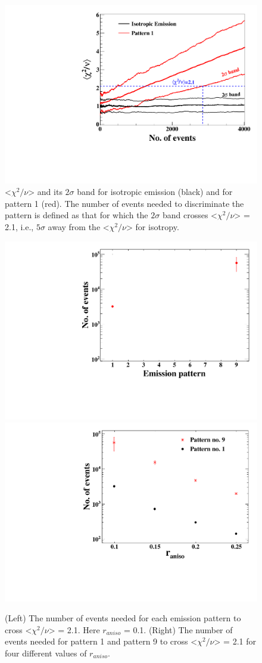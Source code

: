 \begin{figure}[h]
\centerline{\includegraphics[width=0.5\linewidth]{Pattern1.pdf}}
\caption{<$\chi^2/\nu$> and its $2\sigma$ band for isotropic emission (black) and for pattern 1 (red). 
The number of events needed to discriminate the pattern is defined as that for which 
the $2\sigma$ band crosses <$\chi^2/\nu$> = 2.1, i.e., $5\sigma$ away from the <$\chi^2/\nu$> for isotropy. }
\label{fig:pattern1}
\end{figure}

\begin{figure}[h]
\centering
\includegraphics[width=0.45\linewidth]{ConvergenceVsPattern.pdf}
\hspace{0.1cm}
\includegraphics[width=0.45\linewidth]{ConvergenceVsRaniso.pdf}
\caption{(Left) The number of events needed for each emission pattern to cross <$\chi^2/\nu$> = 2.1. Here 
$r_{aniso}$ = 0.1. (Right) The number of events needed for pattern 1 and pattern 9 to cross <$\chi^2/\nu$> = 2.1 
for four different values of $r_{aniso}$.}
\label{fig:convergence}
\end{figure}


